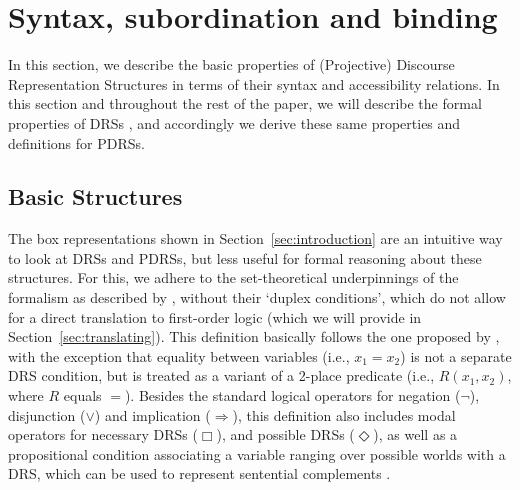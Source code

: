 \section{Syntax, subordination and binding}
\label{sec:building}

In this section, we describe the basic properties of (Projective) Discourse
Representation Structures in terms of their syntax and accessibility
relations. In this section and throughout the rest of the paper, we will
describe the formal properties of DRSs , and accordingly we derive these same
properties and definitions for PDRSs.


\subsection{Basic Structures}

The box representations shown in Section~\ref{sec:introduction} are an
intuitive way to look at DRSs and PDRSs, but less useful for formal
reasoning about these structures. For this, we adhere to the set-theoretical
underpinnings of the formalism as described by
, without their `duplex conditions', which do
not allow for a direct translation to first-order logic (which we will
provide in Section~\ref{sec:translating}). This definition basically follows
the one proposed by , with the exception
that equality between variables (i.e., $x_1=x_2$) is not a separate DRS
condition, but is treated as a variant of a 2-place predicate (i.e.,
$R(x_1,x_2)$, where $R$ equals $=$).  Besides the standard logical operators
for negation ($\neg$), disjunction ($\vee$) and implication ($\Rightarrow$),
this definition also includes modal operators for necessary DRSs ($\Box$),
and possible DRSs ($\Diamond$), as well as a propositional condition
associating a variable ranging over possible worlds with a DRS, which can be
used to represent sentential complements
.


